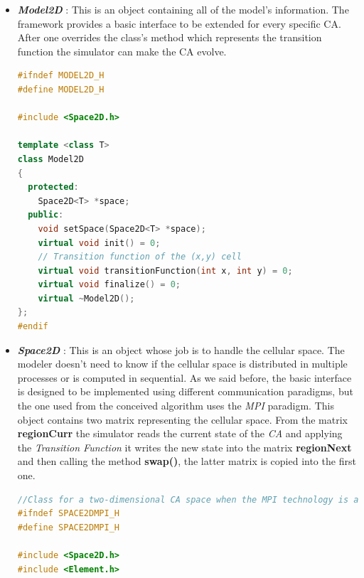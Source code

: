 \documentclass[12pt,a4paper,fleqn]{report}
\begin{document}
\begin{itemize}
\item
\textit{\textbf{Model2D}} : This is an object containing all of the model's information. The framework provides a basic interface to be extended for every specific CA. After one overrides the class's method which represents the transition function the simulator can make the CA evolve.
\begin{lstlisting}[language=C++,
                   directivestyle={\color{black}},
                   emph={int,char,double,float,unsigned},
                   emphstyle={\color{blue}},
                   caption={Model2D.h, Interface to be implemented by the Modeler},
                   captionpos=b
                  ]
#ifndef MODEL2D_H
#define MODEL2D_H

#include <Space2D.h>

template <class T>
class Model2D
{
  protected:
    Space2D<T> *space;
  public:
    void setSpace(Space2D<T> *space);
    virtual void init() = 0;
    // Transition function of the (x,y) cell
    virtual void transitionFunction(int x, int y) = 0;
    virtual void finalize() = 0;
    virtual ~Model2D();
};
#endif
\end{lstlisting}
\item
\textit{\textbf{Space2D}} : This is an object whose job is to handle the cellular space. The modeler doesn't need to know if the cellular space is distributed in multiple processes or is computed in sequential. As we said before, the basic interface is designed to be implemented using different communication paradigms, but the one used from the conceived algorithm uses the \textit{MPI} paradigm. This object contains two matrix representing the cellular space. From the matrix \textbf{regionCurr} the simulator reads the current state of the \textit{CA} and applying the \textit{Transition Function} it writes the new state into the matrix \textbf{regionNext} and then calling the method \textbf{swap()}, the latter matrix is copied into the first one.
\newpage
\begin{lstlisting}[language=C++,
                   directivestyle={\color{black}},
                   emph={int,char,double,float,unsigned},
                   emphstyle={\color{blue}},
                   caption={Space2DMpi.h, Space handler using the MPI paradigm},
                   captionpos=b
                  ]
//Class for a two-dimensional CA space when the MPI technology is adopted
#ifndef SPACE2DMPI_H
#define SPACE2DMPI_H

#include <Space2D.h>
#include <Element.h>


\end{lstlisting}
\end{itemize}
\end{document}
